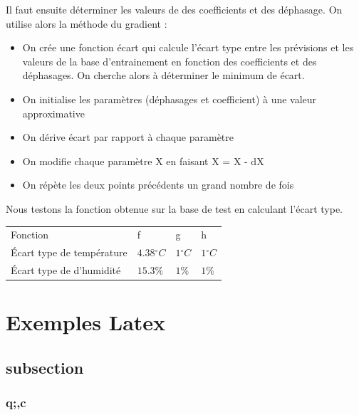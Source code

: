 \documentclass[11pt,a4paper]{article}
\begin{document}
Il faut ensuite déterminer les valeurs de des coefficients et des déphasage. On utilise alors la méthode du gradient :
\begin{itemize}
\item On crée une fonction écart qui calcule l'écart type entre les prévisions et les valeurs de la base d'entrainement en fonction des coefficients et des déphasages. On cherche alors à déterminer le minimum de écart.
\item On initialise les paramètres (déphasages et coefficient) à une valeur approximative
\item On dérive écart par rapport à chaque paramètre
\item On modifie chaque paramètre X en faisant X = X - dX
\item On répète les deux points précédents un grand nombre de fois
\end{itemize}

Nous testons la fonction obtenue sur la base de test en calculant l'écart type.

\begin{tabular}{llll}\hline
\hline
Fonction                             &f                         &g                       &h \\
Écart type de température & $4.38{}^{\circ}C$   & $1{}^{\circ}C$   &  $1{}^{\circ}C$ \\ 
Écart type de d'humidité    & $15.3\%$   & $1\%$   &  $1\%$   \\   
\hline 
\end{tabular}





























\section{Exemples Latex}
\subsection{subsection}
\subsubsection{q;,c}
\end{document}
